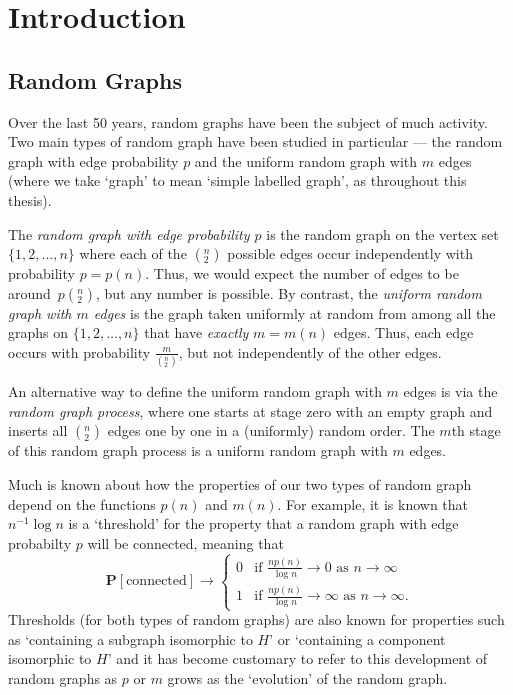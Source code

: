\documentclass{article}
\newtheorem{Proof of Theorem}{Proof of Theorem}
\begin{document}
\newpage
\section{Introduction} \label{aintro}















\subsection*{Random Graphs}

Over the last 50 years, 
random graphs 
have been the subject of much activity.
Two main types of random graph have been studied in particular --- 
the random graph with edge probability $p$ and the uniform random graph with $m$ edges
(where we take `graph' to mean `simple labelled graph',
as throughout this thesis).

The \textit{random graph with edge probability $p$} is the random graph on the vertex set $\{ 1,2, \ldots, n \}$
where each of the $\left( ^{n}_{2} \right)$ possible edges occur independently with probability $p=p(n)$.
Thus, we would expect the number of edges to be around~$p \left( ^{n}_{2} \right)$,
but any number is possible.
By contrast, the \textit{uniform random graph with $m$ edges} is the graph taken uniformly at random
from among all the graphs on $\{ 1,2, \ldots, n \}$ that have \textit{exactly} $m=m(n)$ edges.
Thus, each edge occurs with probability $\frac{m}{ \left( ^{n}_{2} \right) }$,
but not independently of the other edges.

An alternative way to define the uniform random graph with $m$ edges is via the \textit{random graph process},
where one starts at stage zero with an empty graph and inserts all $\left( ^{n}_{2} \right)$ edges
one by one in a (uniformly) random order.
The $m$th stage of this random graph process is a uniform random graph with $m$ edges.

Much is known about how the properties of our two types of random graph depend on the functions $p(n)$ and $m(n)$.
For example, it is known that $n^{-1} \log n$ is a `threshold' for the property that
a random graph with edge probabilty $\!p$ will be connected,
meaning that
\begin{displaymath}
\mathbf{P} [\textrm{connected}] \to
\left\{ \begin{array}{ll}
0 & \textrm{if $\frac{np(n)}{\log n} \to 0 \textrm{ as } n \to \infty$} \\
1 & \textrm{if $\frac{np(n)}{\log n} \to \infty \textrm{ as } n \to \infty$.} 
\end{array} \right. 
\end{displaymath} 
Thresholds (for both types of random graphs) are also known for properties such as 
`containing a subgraph isomorphic to $H$' or `containing a component isomorphic to $H$'
and it has become customary to refer to this development of random graphs as $p$ or $m$ grows as 
the `evolution' of the random graph.
\end{document}
